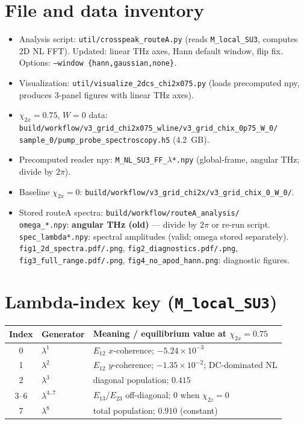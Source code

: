 \documentclass[11pt,a4paper]{article}
\newcommand{\chitwox}{\chi_{2x}}
\newcommand{\chitwoz}{\chi_{2z}}
\begin{document}
\appendix
\section{File and data inventory}
\begin{itemize}[nosep]
  \item Analysis script: \texttt{util/crosspeak\_routeA.py}
        (reads \texttt{M\_local\_SU3}, computes 2D NL FFT).
        Updated: linear THz axes, Hann default window, flip fix.
        Options: \texttt{--window \{hann,gaussian,none\}}.
  \item Visualization: \texttt{util/visualize\_2dcs\_chi2x075.py}
        (loads precomputed npy, produces 3-panel figures with linear THz axes).
  \item $\chitwox=0.75$, $W=0$ data:
        \texttt{build/workflow/v3\_grid\_chi2x075\_wline/v3\_grid\_chix\_0p75\_W\_0/}\\
        \texttt{sample\_0/pump\_probe\_spectroscopy.h5} (4.2~GB).
  \item Precomputed reader npy:
        \texttt{M\_NL\_SU3\_FF\_$\lambda$*.npy} (global-frame, angular THz; divide by $2\pi$).
  \item Baseline $\chitwox=0$:
        \texttt{build/workflow/v3\_grid\_chi2x/v3\_grid\_chix\_0\_W\_0/}.
  \item Stored routeA spectra: \texttt{build/workflow/routeA\_analysis/}\\
        \texttt{omega\_*.npy}: \textbf{angular THz (old)} --- divide by $2\pi$ or re-run script.\\
        \texttt{spec\_lambda*.npy}: spectral amplitudes (valid; omega stored separately).\\
        \texttt{fig1\_2d\_spectra.pdf/.png}, \texttt{fig2\_diagnostics.pdf/.png},
        \texttt{fig3\_full\_range.pdf/.png},
        \texttt{fig4\_no\_apod\_hann.png}: diagnostic figures.
\end{itemize}

\section{Lambda-index key (\texttt{M\_local\_SU3})}
\begin{center}
\begin{tabular}{cll}
\toprule
Index & Generator & Meaning / equilibrium value at $\chitwox=0.75$ \\
\midrule
0 & $\lambda^1$ & $E_{12}$ $x$-coherence; $-5.24\times10^{-3}$ \\
1 & $\lambda^2$ & $E_{12}$ $y$-coherence; $-1.35\times10^{-2}$; DC-dominated NL \\
2 & $\lambda^3$ & diagonal population; $0.415$ \\
3--6 & $\lambda^{4..7}$ & $E_{13}/E_{23}$ off-diagonal; $0$ when $\chitwoz=0$ \\
7 & $\lambda^8$ & total population; $0.910$ (constant) \\
\bottomrule
\end{tabular}
\end{center}
\end{document}
